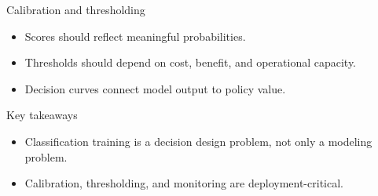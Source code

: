 \documentclass[aspectratio=169,11pt]{beamer}
\begin{document}
\begin{frame}{Calibration and thresholding}
  \begin{itemize}
    \item Scores should reflect meaningful probabilities.
    \item Thresholds should depend on cost, benefit, and operational capacity.
    \item Decision curves connect model output to policy value.
  \end{itemize}
\end{frame}


\begin{frame}{Key takeaways}
  \begin{itemize}
    \item Classification training is a decision design problem, not only a
    modeling problem.
    \item Calibration, thresholding, and monitoring are deployment-critical.
  \end{itemize}
\end{frame}
\end{document}
